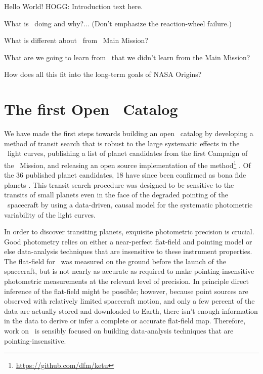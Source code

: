 \documentclass[12pt,preprint]{aastex}
\begin{document}
Hello World!  HOGG:  Introduction text here.

What is \ketu\ doing and why?... (Don't emphasize the reaction-wheel failure.)

What is different about \ketu\ from \kepler\ Main Mission?

What are we going to learn from \ketu\ that we didn't learn from the Main Mission?

How does all this fit into the long-term goals of NASA Origins?

\section{The first Open \ketu\ Catalog}

We have made the first steps towards building an open \ketu\ catalog by
developing a method of transit search that is robust to the large systematic
effects in the \ketu\ light curves, publishing a list of planet candidates
from the first Campaign of the \ketu\ Mission, and releasing an open source
implementation of the method\footnote{\url{https://github.com/dfm/ketu}}
\citep{Foreman-Mackey:2015}.
Of the 36 published planet candidates, 18 have since been confirmed as bona
fide planets \citep{Armstrong:2015, Montet:2015}.
This transit search procedure was designed to be sensitive to the transits of
small planets even in the face of the degraded pointing of the \kepler\
spacecraft by using a data-driven, causal model for the systematic photometric
variability of the light curves.



In order to discover transiting planets, exquisite photometric precision is
crucial.
Good photometry relies on either a near-perfect flat-field
and pointing model or else data-analysis techniques that are
insensitive to these instrument properties.
The flat-field for \kepler\ was measured on the ground before the launch of
the spacecraft, but is not nearly as accurate as required to make
pointing-insensitive photometric measurements at the relevant level of
precision.
In principle direct inference of the flat-field might be possible;
however, because point sources are observed with relatively limited
spacecraft motion, and only a few percent of the data are actually stored and
downloaded to Earth, there isn't enough information in the data to derive or
infer a complete or accurate flat-field map.
Therefore, work on \KT\ is sensibly focused on building data-analysis
techniques that are pointing-insensitive.
\end{document}
